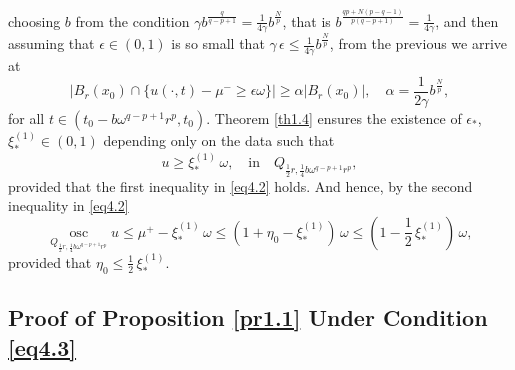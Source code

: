 \documentclass[a4paper,11pt,fullpage]{article}
\DeclareMathOperator*{\osc}{osc}
\numberwithin{equation}{section}
\begin{document}
choosing $b$ from the condition $\gamma b^{\frac{q}{q-p+1}}=\frac{1}{4\gamma}b^{\frac{N}{p}}$, that is $b^{\frac{qp+N(p-q-1)}{p(q-p+1)}}=\frac{1}{4\gamma}$, and then assuming that  $\epsilon\in (0, 1)$ is so small that $\gamma\,\epsilon\leqslant \frac{1}{4\gamma}b^{\frac{N}{p}}$, from the previous we arrive at
\begin{equation}\label{eq4.8}
|B_r(x_0)\cap\{u(\cdot, t)-\mu^-\geqslant \epsilon \omega\}|\geqslant \alpha |B_r(x_0)|,\quad \alpha=\frac{1}{2\gamma} b^{\frac{N}{p}},
\end{equation}
for all $t\in(t_0-b \omega^{q-p+1} r^p, t_0)$.  Theorem \ref{th1.4} ensures the existence
of $\epsilon_*$, $\xi^{(1)}_*\in (0, 1)$ depending only on the data such that
$$u \geqslant \xi^{(1)}_*\,\omega,\quad \text{in}\quad Q_{\frac{1}{2} r, \frac{1}{4} b \omega^{q-p+1} r^p},$$
provided that the first inequality in \eqref{eq4.2} holds. And hence, by the second inequality in \eqref{eq4.2}
\begin{equation}\label{eq4.9}
\osc\limits_{Q_{\frac{1}{2} r, \frac{1}{4} b \omega^{q-p+1} r^p}} u\leqslant \mu^+ -\xi^{(1)}_*\,\omega \leqslant (1+\eta_0-\xi^{(1)}_*)\,\omega \leqslant (1-\frac{1}{2}\,\xi^{(1)}_*)\,\omega,
\end{equation}
provided that $\eta_0\leqslant \frac{1}{2}\,\xi^{(1)}_*.$




\subsection{Proof of Proposition \ref{pr1.1} Under Condition \ref{eq4.3}}
\end{document}
